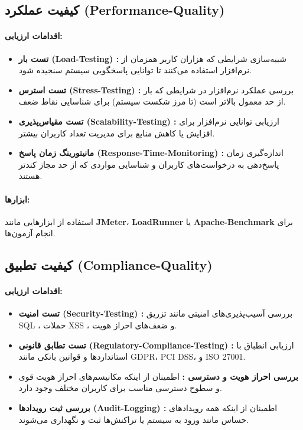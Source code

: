 
\subsection*{کیفیت عملکرد (Performance-Quality)}
\paragraph{اقدامات ارزیابی:}
\begin{itemize}
	\item \textbf{تست بار (Load-Testing) :} شبیه‌سازی شرایطی که هزاران کاربر همزمان از نرم‌افزار استفاده می‌کنند تا توانایی پاسخگویی سیستم سنجیده شود.
	\item \textbf{تست استرس (Stress-Testing) :} بررسی عملکرد نرم‌افزار در شرایطی که بار از حد معمول بالاتر است (تا مرز شکست سیستم) برای شناسایی نقاط ضعف.
	\item \textbf{تست مقیاس‌پذیری (Scalability-Testing) :} ارزیابی توانایی نرم‌افزار برای افزایش یا کاهش منابع برای مدیریت تعداد کاربران بیشتر.
	\item \textbf{مانیتورینگ زمان پاسخ (Response-Time-Monitoring) :} اندازه‌گیری زمان پاسخ‌دهی به درخواست‌های کاربران و شناسایی مواردی که از حد مجاز کندتر هستند.
\end{itemize}

\paragraph{ابزارها:}
استفاده از ابزارهایی مانند \textbf{JMeter}، \textbf{LoadRunner} یا \textbf{Apache-Benchmark} برای انجام آزمون‌ها.

\subsection*{کیفیت تطبیق (Compliance-Quality)}
\paragraph{اقدامات ارزیابی:}
\begin{itemize}
	\item \textbf{تست امنیت (Security-Testing) :} بررسی آسیب‌پذیری‌های امنیتی مانند تزریق SQL ، حملات XSS ، و ضعف‌های احراز هویت.
	\item \textbf{تست تطابق قانونی (Regulatory-Compliance-Testing) :} ارزیابی انطباق با استانداردها و قوانین بانکی مانند GDPR، PCI DSS، و ISO 27001.
	\item \textbf{بررسی احراز هویت و دسترسی :} اطمینان از اینکه مکانیسم‌های احراز هویت قوی و سطوح دسترسی مناسب برای کاربران مختلف وجود دارد.
	\item \textbf{بررسی ثبت رویدادها (Audit-Logging) :} اطمینان از اینکه همه رویدادهای حساس مانند ورود به سیستم یا تراکنش‌ها ثبت و نگهداری می‌شوند.
\end{itemize}

